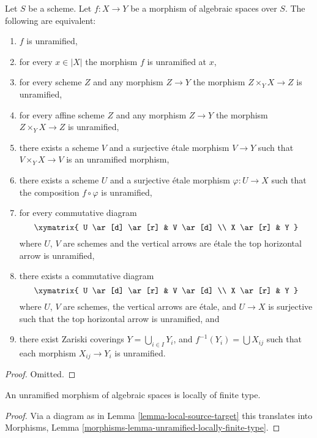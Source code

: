 \begin{lemma}
\label{lemma-unramified-local}
Let $S$ be a scheme.
Let $f : X \to Y$ be a morphism of algebraic spaces over $S$.
The following are equivalent:
\begin{enumerate}
\item $f$ is unramified,
\item for every $x \in |X|$ the morphism $f$ is unramified at $x$,
\item for every scheme $Z$ and any morphism $Z \to Y$ the morphism
$Z \times_Y X \to Z$ is unramified,
\item for every affine scheme $Z$ and any morphism
$Z \to Y$ the morphism $Z \times_Y X \to Z$ is unramified,
\item there exists a scheme $V$ and a surjective \'etale morphism
$V \to Y$ such that $V \times_Y X \to V$ is an unramified morphism,
\item there exists a scheme $U$ and a surjective \'etale morphism
$\varphi : U \to X$ such that the composition $f \circ \varphi$
is unramified,
\item for every commutative diagram
$$
\xymatrix{
U \ar[d] \ar[r] & V \ar[d] \\
X \ar[r] & Y
}
$$
where $U$, $V$ are schemes and the vertical arrows are \'etale
the top horizontal arrow is unramified,
\item there exists a commutative diagram
$$
\xymatrix{
U \ar[d] \ar[r] & V \ar[d] \\
X \ar[r] & Y
}
$$
where $U$, $V$ are schemes, the vertical arrows are \'etale, and
$U \to X$ is surjective such that the top horizontal arrow is unramified, and
\item there exist Zariski coverings $Y = \bigcup_{i \in I} Y_i$,
and $f^{-1}(Y_i) = \bigcup X_{ij}$ such that
each morphism $X_{ij} \to Y_i$ is unramified.
\end{enumerate}
\end{lemma}

\begin{proof}
Omitted.
\end{proof}


\begin{lemma}
\label{lemma-unramified-locally-finite-type}
An unramified morphism of algebraic spaces is locally of finite type.
\end{lemma}

\begin{proof}
Via a diagram as in
Lemma \ref{lemma-local-source-target}
this translates into
Morphisms, Lemma \ref{morphisms-lemma-unramified-locally-finite-type}.
\end{proof}


